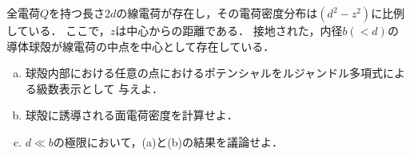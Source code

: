 \begin{bx1}
  全電荷$Q$を持つ長さ$2d$の線電荷が存在し，その電荷密度分布は$(d^2 - z^2)$に比例している．
  ここで，$z$は中心からの距離である．
  接地された，内径$b(< d)$の導体球殻が線電荷の中点を中心として存在している．
  \begin{enumerate}[(a)]%
    \item  
      球殻内部における任意の点におけるポテンシャルをルジャンドル多項式による級数表示として
      与えよ．
    \item 
      球殻に誘導される面電荷密度を計算せよ．
    \item
      $d \ll b$の極限において，(a)と(b)の結果を議論せよ．
  \end{enumerate}%
\end{bx1}

\clearpage
